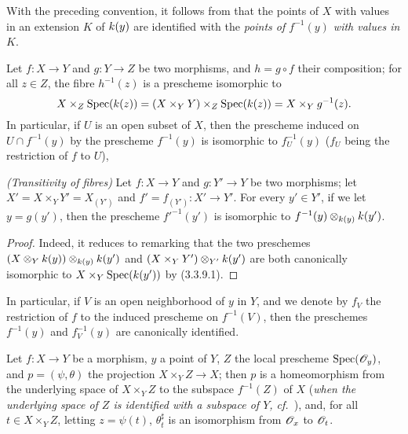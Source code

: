 With the preceding convention, it follows from  that the points of $X$ with values in an extension $K$ of $k(y)$ are identified with the \emph{points of $f^{-1}(y)$ with values in $K$}.

\begin{env}[3.6.3]
\label{1.3.6.3}
Let $f:X\to Y$ and $g:Y\to Z$ be two morphisms, and $h=g\circ f$ their composition; for all $z\in Z$, the fibre $h^{-1}(z)$ is a prescheme isomorphic to
\[
  X\times_Z{\mathop{\mathrm{Spec}}\nolimits}(k(z))=(X\times_Y Y)\times_Z{\mathop{\mathrm{Spec}}\nolimits}(k(z))=X\times_Y g^{-1}(z).
\]
In particular, if $U$ is an open subset of $X$, then the prescheme induced on $U\cap f^{-1}(y)$ by the prescheme $f^{-1}(y)$ is isomorphic to $f^{-1}_U(y)$ ($f_U$ being the restriction of $f$ to $U$),
\end{env}

\begin{prop}[3.6.4]
\label{1.3.6.4}
\emph{(Transitivity of fibres)}
Let $f:X\to Y$ and $g:Y'\to Y$ be two morphisms; let $X'=X\times_Y Y'=X_{(Y')}$ and $f'=f_{(Y')}:X'\to Y'$.
For every $y'\in Y'$, if we let $y=g(y')$, then the prescheme $f'^{-1}(y')$ is isomorphic to $f^{-1}(y)\otimes_{k(y)}k(y')$.
\end{prop}

\begin{proof}
\label{proof-1.3.6.4}
Indeed, it reduces to remarking that the two preschemes $(X\otimes_Yk(y))\otimes_{k(y)}k(y')$ and $(X\times_Y Y')\otimes_{Y'}k(y')$ are both canonically isomorphic to $X\times_Y{\mathop{\mathrm{Spec}}\nolimits}(k(y'))$ by (3.3.9.1).
\end{proof}

In particular, if $V$ is an open neighborhood of $y$ in $Y$, and we denote by $f_V$ the restriction of $f$ to the induced prescheme on $f^{-1}(V)$, then the preschemes $f^{-1}(y)$ and $f^{-1}_V(y)$ are canonically identified.

\begin{prop}[3.6.5]
\label{1.3.6.5}
Let $f:X\to Y$ be a morphism, $y$ a point of $Y$, $Z$ the local prescheme ${\mathop{\mathrm{Spec}}\nolimits}(\mathscr{O}_y)$, and $p=(\psi,\theta)$ the projection $X\times_Y Z\to X$; then $p$ is a homeomorphism from the underlying space of $X\times_Y Z$ to the subspace $f^{-1}(Z)$ of $X$ (\emph{when the underlying space of $Z$ is identified with a subspace of $Y$, cf.~}), and, for all $t\in X\times_Y Z$, letting $z=\psi(t)$, $\theta_t^\sharp$ is an isomorphism from $\mathscr{O}_x$ to $\mathscr{O}_t$.
\end{prop}

